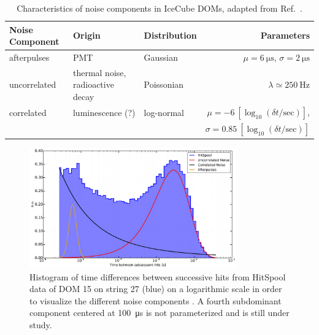 \begin{table}[h!]
\caption{Characteristics of noise components in IceCube DOMs, adapted from
  Ref.~\cite{stanisha_noise_14}.}
  \centering
  \footnotesize
\begin{tabularx}{\textwidth}{lXXr}
\toprule
Noise Component& Origin & Distribution & Parameters \\
\midrule
afterpulses & PMT & Gaussian & $\mu = \SI{6}{\micro\second}$, $\sigma = \SI{2}{\micro\second}$\\
uncorrelated & thermal noise, \newline radioactive decay & Poissonian & $\lambda \simeq \SI{250}{\hertz}$\\
correlated & luminescence (?) & log-normal &
$\mu = \num{-6}\ [\log_{10}(\delta t/\mathrm{sec})]$, \\
& & & 
$\sigma = \num{0.85}\ [\log_{10}(\delta t/\mathrm{sec})]$ \\
\bottomrule
\end{tabularx}
\label{tab:noise}
\end{table}

\begin{figure}[!h]
 \centering
  \includegraphics[width=0.8\textwidth]{graphics/dom/performance/darknoise/SingleDOM_HitSpool_Hits_deltaT_fits_example.pdf}
 \caption{Histogram of time differences between successive hits from HitSpool data of
DOM 15 on string 27 (blue) on a logarithmic scale in order to visualize the
different noise components \cite{heereman2015hitspooling}.  A fourth
subdominant component centered at \SI{100}{\micro\second} is not parameterized and is still under study.}
 \label{fig:darknoise_deltaT_components}
\end{figure}

